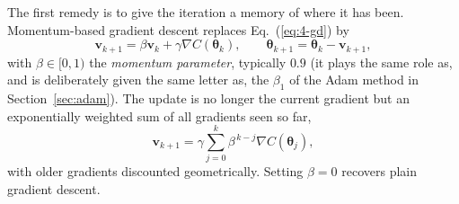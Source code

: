 The first remedy is to give the iteration a memory of where it has been.
Momentum-based gradient descent replaces Eq.~(\ref{eq:4-gd}) by
\begin{equation}
  \bm{v}_{k+1} = \beta\bm{v}_k + \gamma\nabla C(\bm{\theta}_k),
  \qquad
  \bm{\theta}_{k+1} = \bm{\theta}_k - \bm{v}_{k+1},
  \label{eq:4-momentum}
\end{equation}
with $\beta\in[0,1)$ the \emph{momentum parameter}, typically $0.9$ (it plays
the same role as, and is deliberately given the same letter as, the $\beta_1$
of the Adam method in Section~\ref{sec:adam}).  The
update is no longer the current gradient but an exponentially weighted sum of
all gradients seen so far,
\begin{equation}
  \bm{v}_{k+1} = \gamma\sum_{j=0}^{k}\beta^{\,k-j}\nabla C(\bm{\theta}_j),
  \label{eq:4-momentumsum}
\end{equation}
with older gradients discounted geometrically.  Setting $\beta=0$ recovers
plain gradient descent.

